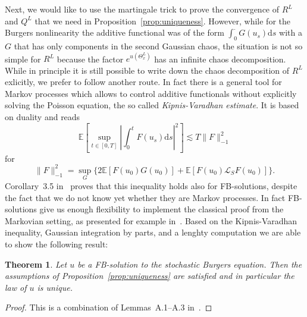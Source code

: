 \documentclass[a4paper,11pt]{article}
\newcommand{\cdummy}{\cdot}
\newcommand{\mathd}{\mathrm{d}}
\newtheorem{theorem}{Theorem}[section]
\newcommand{\1}{\mathds{1}}
\begin{document}
Next, we would like to use the martingale trick to prove the convergence of
$R^L$ and $Q^L$ that we need in Proposition~\ref{prop:uniqueness}. However, while
for the Burgers nonlinearity the additive functional was of the form $\int_0^{\cdummy} G (u_s) \mathd s$ with a $G$ that has only
components in the second Gaussian chaos, the situation is not so simple for
$R^L$ because the factor $e^{u (\Theta^L_x)}$ has an infinite chaos
decomposition. While in principle it is still possible to write down the chaos
decomposition of $R^L$ exlicitly, we prefer to follow another route. In fact
there is a general tool for Markov processes which allows to control additive
functionals without explicitly solving the Poisson equation, the so called
\emph{Kipnis-Varadhan estimate}. It is based on duality and reads
\[ \mathbb{E} \left[ \sup_{t \in [0, T]} \left| \int_0^t F (u_s) \mathd s
   \right|^2 \right] \lesssim T \| F \|_{- 1}^2 \]
for
\[ \| F \|_{- 1}^2 = \sup_G \{ 2\mathbb{E} [F (u_0) G (u_0)] +\mathbb{E} [F
   (u_0) \mathcal{L}_S F (u_0)] \} . \]
Corollary~3.5 in~{\cite{GP16}} proves that this inequality holds also for FB-solutions, despite the fact
that we do not know yet whether they are Markov processes. In fact FB-solutions give us enough flexibility
to implement the classical proof from the Markovian setting, as presented for
example in~{\cite{KLO12}}. Based on the Kipnis-Varadhan inequality, Gaussian
integration by parts, and a lenghty computation we are able to show the
following result:

\begin{theorem}
  Let $u$ be a FB-solution to the stochastic Burgers equation. Then the assumptions of
  Proposition~\ref{prop:uniqueness} are satisfied and in particular the law
  of $u$ is unique.
\end{theorem}

\begin{proof}
  This is a combination of Lemmas~A.1--A.3 in~{\cite{GP16}}.
\end{proof}
\end{document}
